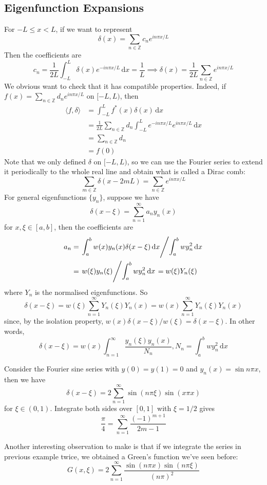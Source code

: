 \subsection{Eigenfunction Expansions}
For $-L\le x<L$, if we want to represent
$$\delta(x)=\sum_{n\in\mathbb Z}c_ne^{in\pi x/L}$$
Then the coefficients are
$$c_n=\frac{1}{2L}\int_{-L}^L\delta(x)e^{-in\pi x/L}\,\mathrm dx=\frac{1}{L}\implies \delta(x)=\frac{1}{2L}\sum_{n\in\mathbb Z}e^{in\pi x/L}$$
We obvious want to check that it has compatible properties.
Indeed, if $f(x)=\sum_{n\in\mathbb Z}d_ne^{in\pi x/L}$ on $[-L,L)$, then
\begin{align*}
    \langle f,\delta\rangle&=\int_{-L}^Lf^*(x)\delta(x)\,\mathrm dx\\
    &=\frac{1}{2L}\sum_{n\in\mathbb Z}d_n\int_{-L}^Le^{-in\pi x/L}e^{in\pi x/L}\,\mathrm dx\\
    &=\sum_{n\in\mathbb Z}d_n\\
    &=f(0)
\end{align*}
Note that we only defined $\delta$ on $[-L,L)$, so we can use the Fourier series to extend it periodically to the whole real line and obtain what is called a Dirac comb:
$$\sum_{m\in\mathbb Z}\delta(x-2mL)=\sum_{n\in\mathbb Z}e^{in\pi x/L}$$
For general eigenfunctions $\{y_n\}$, suppose we have
$$\delta(x-\xi)=\sum_{n=1}^\infty a_ny_n(x)$$
for $x,\xi\in [a,b]$, then the coefficients are
\begin{align*}
    a_n&=\left. \int_a^bw(x)y_n(x)\delta(x-\xi)\,\mathrm dx \middle/ \int_a^bwy_n^2\,\mathrm dx\right.\\
    &=\left. w(\xi)y_n(\xi) \middle/ \int_a^bwy_n^2\,\mathrm dx\right.=w(\xi)Y_n(\xi)
\end{align*}
where $Y_n$ is the normalised eigenfunctions.
So
$$\delta(x-\xi)=w(\xi)\sum_{n=1}^\infty Y_n(\xi)Y_n(x)=w(x)\sum_{n=1}^\infty Y_n(\xi)Y_n(x)$$
since, by the isolation property, $w(x)\delta(x-\xi)/w(\xi)=\delta(x-\xi)$.
In other words,
$$\delta(x-\xi)=w(x)\int_{n=1}^\infty\frac{y_n(\xi)y_n(x)}{N_n},N_n=\int_a^bwy_n^2\,\mathrm dx$$
\begin{example}
    Consider the Fourier sine series with $y(0)=y(1)=0$ and $y_n(x)=\sin n\pi x$, then we have
    $$\delta(x-\xi)=2\sum_{n=1}^\infty\sin(n\pi\xi)\sin(x\pi x)$$
    for $\xi\in (0,1)$.
    Integrate both sides over $[0,1]$ with $\xi=1/2$ gives
    $$\frac{\pi}{4}=\sum_{n=1}^\infty\frac{(-1)^{m+1}}{2m-1}$$
\end{example}
Another interesting observation to make is that if we integrate the series in previous example twice, we obtained a Green's function we've seen before:
$$G(x,\xi)=2\sum_{n=1}^\infty\frac{\sin(n\pi x)\sin(n\pi\xi)}{(n\pi)^2}$$